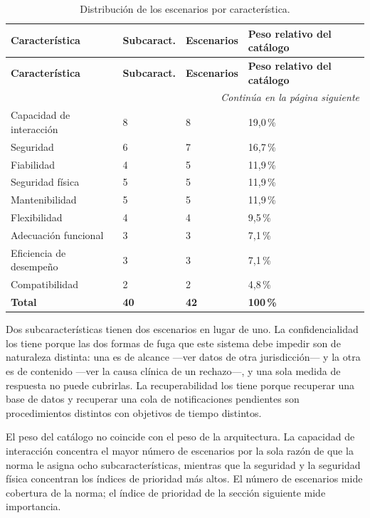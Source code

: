 \documentclass[11pt,a4paper]{article}
\newcommand{\contlinea}[1]{\multicolumn{#1}{r}{\footnotesize\itshape Continúa en la página siguiente}}
\begin{document}
\begin{longtable}{L{4.2cm} L{2.6cm} L{2.6cm} L{4.6cm}}
\caption{Distribución de los escenarios por característica.}\label{tab:distribucion}\\
\toprule
\textbf{Característica} & \textbf{Subcaract.} & \textbf{Escenarios} & \textbf{Peso relativo del catálogo} \\
\midrule
\endfirsthead
\toprule
\textbf{Característica} & \textbf{Subcaract.} & \textbf{Escenarios} & \textbf{Peso relativo del catálogo} \\
\midrule
\endhead
\midrule
\contlinea{4} \\
\endfoot
\bottomrule
\endlastfoot
Capacidad de interacción & 8 & 8 & 19,0\,\% \\
Seguridad & 6 & 7 & 16,7\,\% \\
Fiabilidad & 4 & 5 & 11,9\,\% \\
Seguridad física & 5 & 5 & 11,9\,\% \\
Mantenibilidad & 5 & 5 & 11,9\,\% \\
Flexibilidad & 4 & 4 & 9,5\,\% \\
Adecuación funcional & 3 & 3 & 7,1\,\% \\
Eficiencia de desempeño & 3 & 3 & 7,1\,\% \\
Compatibilidad & 2 & 2 & 4,8\,\% \\
\midrule
\textbf{Total} & \textbf{40} & \textbf{42} & \textbf{100\,\%} \\
\end{longtable}

\noindent Dos subcaracterísticas tienen dos escenarios en lugar de uno. La confidencialidad los tiene porque las dos formas de fuga que este sistema debe impedir son de naturaleza distinta: una es de alcance ---ver datos de otra jurisdicción--- y la otra es de contenido ---ver la causa clínica de un rechazo---, y una sola medida de respuesta no puede cubrirlas. La recuperabilidad los tiene porque recuperar una base de datos y recuperar una cola de notificaciones pendientes son procedimientos distintos con objetivos de tiempo distintos.

El peso del catálogo no coincide con el peso de la arquitectura. La capacidad de interacción concentra el mayor número de escenarios por la sola razón de que la norma le asigna ocho subcaracterísticas, mientras que la seguridad y la seguridad física concentran los índices de prioridad más altos. El número de escenarios mide cobertura de la norma; el índice de prioridad de la sección siguiente mide importancia.
\end{document}
